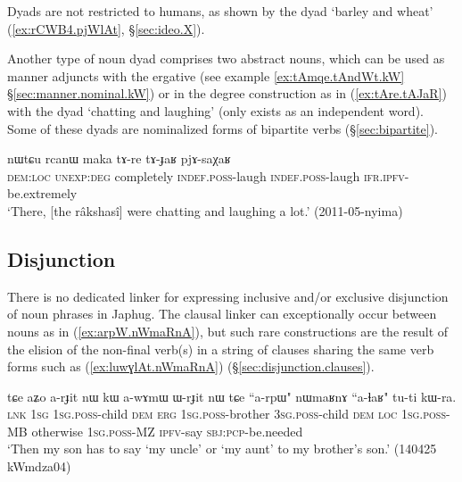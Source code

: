 Dyads are not restricted to humans, as shown by the dyad  `barley and wheat' (\ref{ex:rCWB4.pjWlAt}, §\ref{sec:ideo.X}).

Another type of noun dyad comprises two abstract nouns, which can be used as manner adjuncts with the ergative (see example \ref{ex:tAmqe.tAndWt.kW} §\ref{sec:manner.nominal.kW}) or in the degree construction as in (\ref{ex:tAre.tAJaR}) with the dyad  `chatting and laughing' (only  exists as an independent word). Some of these dyads are nominalized forms of bipartite verbs (§\ref{sec:bipartite}).

\begin{exe}
\ex \label{ex:tAre.tAJaR}
 \gll  nɯtɕu rcanɯ maka tɤ-re tɤ-ɟaʁ pjɤ-saχaʁ \\
 \textsc{dem}:\textsc{loc} \textsc{unexp}:\textsc{deg} completely \textsc{indef}.\textsc{poss}-laugh \textsc{indef}.\textsc{poss}-laugh  \textsc{ifr}.\textsc{ipfv}-be.extremely \\
 \glt `There, [the râkshasî] were chatting and laughing a lot.' (2011-05-nyima)
\end{exe}

\subsection{Disjunction}  \label{sec:disjunction.nouns}
There is no dedicated linker for expressing inclusive and/or exclusive disjunction of noun phrases in Japhug. The clausal linker  can exceptionally occur between nouns as in (\ref{ex:arpW.nWmaRnA}), but such rare constructions are the result of the elision of the non-final verb(s) in a string of clauses sharing the same verb forms such as (\ref{ex:luwɣlAt.nWmaRnA}) (§\ref{sec:disjunction.clauses}).

\begin{exe}
\ex \label{ex:arpW.nWmaRnA}
 \gll tɕe aʑo a-rɟit nɯ kɯ a-wɤmɯ ɯ-rɟit nɯ tɕe ``a-rpɯ" nɯmaʁnɤ ``a-ɬaʁ" tu-ti kɯ-ra. \\
 \textsc{lnk} \textsc{1sg} \textsc{1sg}.\textsc{poss}-child \textsc{dem} \textsc{erg} \textsc{1sg}.\textsc{poss}-brother \textsc{3sg}.\textsc{poss}-child \textsc{dem} \textsc{loc} \textsc{1sg}.\textsc{poss}-MB otherwise \textsc{1sg}.\textsc{poss}-MZ \textsc{ipfv}-say \textsc{sbj}:\textsc{pcp}-be.needed \\
\glt `Then my son has to say `my uncle' or `my aunt' to my brother's son.'  (140425 kWmdza04)
 \end{exe}
 
